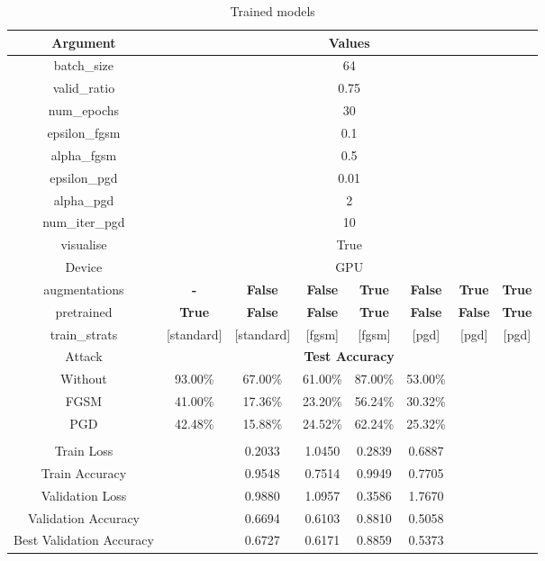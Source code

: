 \documentclass{article}
\begin{document}
\begin{table}[H]
    \centering
    \begin{tabular}{|c|ccccccc|}
    \hline
    \textbf{Argument} & \multicolumn{7}{|c|}{\textbf{Values}} \\
    \hline
    batch\_size &       \multicolumn{7}{c|}{64} \\
    valid\_ratio &      \multicolumn{7}{c|}{0.75} \\
    num\_epochs &       \multicolumn{7}{c|}{30} \\
    epsilon\_fgsm &     \multicolumn{7}{c|}{0.1} \\
    alpha\_fgsm &       \multicolumn{7}{c|}{0.5} \\
    epsilon\_pgd &      \multicolumn{7}{c|}{0.01} \\
    alpha\_pgd &        \multicolumn{7}{c|}{2} \\
    num\_iter\_pgd &    \multicolumn{7}{c|}{10} \\
    visualise &         \multicolumn{7}{c|}{True} \\
    Device &            \multicolumn{7}{c|}{GPU} \\
    augmentations & \textbf{-}  & \textbf{False} & \textbf{False} & \textbf{True} & \textbf{False} & \textbf{True} & \textbf{True}\\
    pretrained & \textbf{True}  & \textbf{False} & \textbf{False} & \textbf{True} & \textbf{False} & \textbf{False}& \textbf{True}\\
    train\_strats & [standard] & [standard] & [fgsm] & [fgsm] & [pgd] & [pgd] & [pgd] \\
    \hline
    Attack & \multicolumn{7}{c|}{\textbf{Test Accuracy}}\\
    \hline
    Without     & 93.00\% & 67.00\% & 61.00\% & 87.00\% & 53.00\% & & \\
    FGSM        & 41.00\% & 17.36\% & 23.20\% & 56.24\% & 30.32\% & & \\
    PGD         & 42.48\% & 15.88\% & 24.52\% & 62.24\% & 25.32\% & & \\
    \hline
    \multicolumn{8}{|c|}{\textbf{}}\\
    \hline
    Train Loss                  & & 0.2033 & 1.0450 & 0.2839 & 0.6887 & & \\
    Train Accuracy              & & 0.9548 & 0.7514 & 0.9949 & 0.7705 & & \\
    Validation Loss             & & 0.9880 & 1.0957 & 0.3586 & 1.7670 & & \\
    Validation Accuracy         & & 0.6694 & 0.6103 & 0.8810 & 0.5058 & & \\
    Best Validation Accuracy    & & 0.6727 & 0.6171 & 0.8859 & 0.5373 & & \\
    \hline
    \end{tabular}
    \caption{Trained models}
\end{table}
\end{document}
